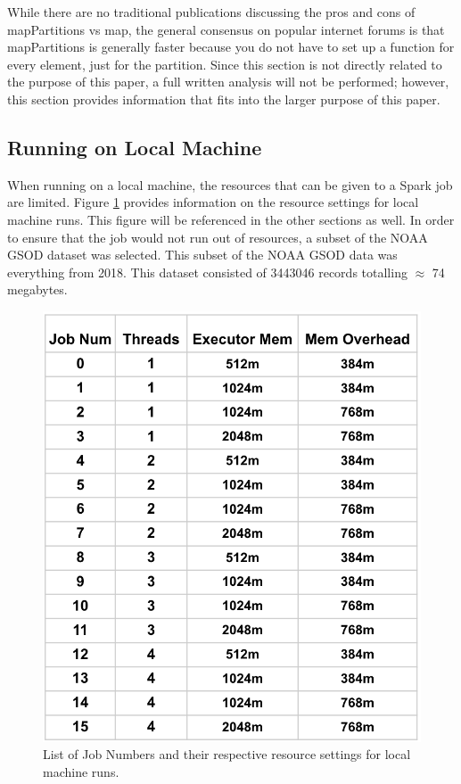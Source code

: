 \documentclass[conference]{IEEEtran}
\begin{document}
While there are no traditional publications discussing the pros and cons of mapPartitions vs map, the general consensus on popular internet forums is that mapPartitions is generally faster because you do not have to set up a function for every element, just for the partition.
Since this section is not directly related to the purpose of this paper, a full written analysis will not be performed; however, this section provides information that fits into the larger purpose of this paper.

\subsection{Running on Local Machine}

When running on a local machine, the resources that can be given to a Spark job are limited.
Figure \ref{fig:localjobs} provides information on the resource settings for local machine runs.
This figure will be referenced in the other sections as well.
In order to ensure that the job would not run out of resources, a subset of the NOAA GSOD dataset was selected.
This subset of the NOAA GSOD data was everything from 2018.
This dataset consisted of 3443046 records totalling $\approx$ 74 megabytes.

\begin{figure}
    \includegraphics[width=\linewidth]{presentation_table.PNG}
    \caption{List of Job Numbers and their respective resource settings for local machine runs.}
    \label{fig:localjobs}
\end{figure}
\end{document}
